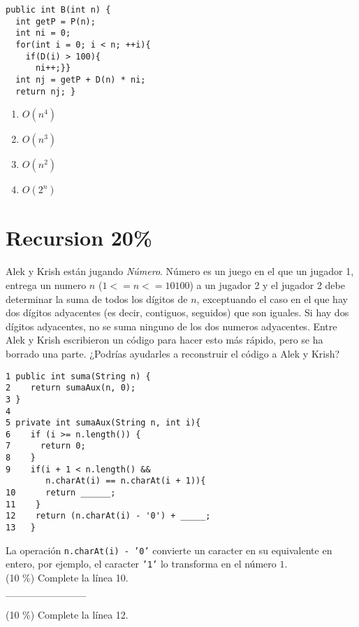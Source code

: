 \documentclass[twocolumn]{article}
\begin{document}
{\small
\begin{verbatim}
public int B(int n) {
  int getP = P(n);
  int ni = 0;
  for(int i = 0; i < n; ++i){
    if(D(i) > 100){
      ni++;}}  
  int nj = getP + D(n) * ni;
  return nj; }
\end{verbatim}


\begin{enumerate}[label=\Alph*.]
  \item $O (n^4)$
  \item $O (n^3)$
  \item $O (n^2)$
  \item $O (2^n)$
\end{enumerate} 



\section{Recursion 20\%}

Alek y Krish están jugando \emph{Número}. Número es un juego en el que un jugador 1, entrega un numero $n$ ($1 <= n <= 10100$) a un jugador 2 y el jugador 2 debe determinar la suma de todos los dígitos de $n$, exceptuando el caso en el que hay dos dígitos adyacentes (es decir, contiguos, seguidos) que son iguales. Si hay dos dígitos adyacentes, no se suma ninguno de los dos numeros adyacentes. Entre Alek y Krish escribieron un código para hacer esto más rápido, pero se ha borrado una parte. ¿Podrías ayudarles a reconstruir el código a Alek y Krish?

{\small
\begin{verbatim}
1 public int suma(String n) {
2    return sumaAux(n, 0);
3 }
4
5 private int sumaAux(String n, int i){
6    if (i >= n.length()) {
7      return 0;
8    }
9    if(i + 1 < n.length() && 
        n.charAt(i) == n.charAt(i + 1)){
10      return ______; 
11    }
12    return (n.charAt(i) - '0') + _____; 
13   }
\end{verbatim}
}

La operación \texttt{n.charAt(i) - '0'} convierte un caracter en su equivalente en entero,
por ejemplo, el caracter \texttt{'1'} lo transforma en el número $1$. \\

(10 \%) Complete la línea 10.\\

\_\_\_\_\_\_\_\_\_\_\_\ 

(10 \%) Complete la línea 12.\\

}
\end{document}
